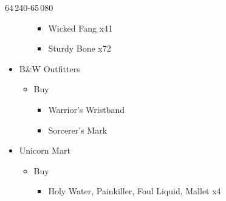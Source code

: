 \begin{shop}{64\,240-65\,080}
\begin{itemize}
\begin{itemize}
\begin{itemize}
					            \item Wicked Fang x41
					            \item Sturdy Bone x72
				            \end{itemize}
			      \end{itemize}
			\item B\&W Outfitters
			      \begin{itemize}
				      \item Buy
				            \begin{itemize}
					            \item Warrior's Wristband
					            \item Sorcerer's Mark
				            \end{itemize}
			      \end{itemize}
			\item Unicorn Mart
			      \begin{itemize}
				      \item Buy
				            \begin{itemize}
					            \item Holy Water, Painkiller, Foul Liquid, Mallet x4
				            \end{itemize}
			      \end{itemize}
		\end{itemize}
	\end{shop}

